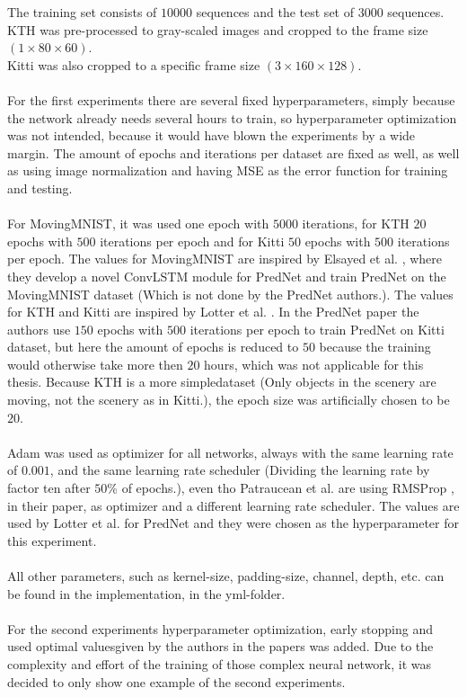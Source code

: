   The training set consists of $10000$ sequences and the test set of $3000$ sequences.\\
  KTH was pre-processed to gray-scaled images and cropped to the frame size $(1 \times 80 \times 60)$.\\
  Kitti was also cropped to a specific frame size $(3 \times 160 \times 128)$.
  \\\\
  For the first experiments there are several fixed hyperparameters, simply because the network already needs several hours to train, so hyperparameter 
  optimization was not intended, because it would have blown the experiments by a wide margin.
  The amount of epochs and iterations per dataset are fixed as well, as well as using image normalization and having MSE as the
  error function for training and testing.
  \\\\
  For MovingMNIST, it was used one epoch with $5000$ iterations, for KTH $20$ epochs with $500$ iterations per epoch and for Kitti $50$ epochs with $500$ 
  iterations per epoch. The values for MovingMNIST are inspired by Elsayed et al. \cite{Elsayed2018}, where they develop a novel ConvLSTM module for PredNet and 
  train PredNet on the MovingMNIST dataset (Which is not done by the PredNet authors.).
  The values for KTH and Kitti are inspired by Lotter et al. \cite{Lotter2016}.
  In the PredNet paper the authors use $150$ epochs with $500$ iterations per epoch to train PredNet on Kitti dataset, but here the amount of epochs is reduced to
  $50$ because the training would otherwise take more then $20$ hours, which was not applicable for this thesis. Because KTH is a more \glqq simple\grqq dataset 
  (Only 
  objects in the scenery are moving, not the scenery as in Kitti.), the epoch size was artificially chosen to be $20$.
  \\\\
  Adam \cite{Kingma2015} was used as optimizer for all networks, always with the same learning rate of $0.001$, and the same learning rate scheduler (Dividing the 
  learning rate by factor ten after $50$\% of epochs.), even tho 
  Patraucean et al. \cite{Patraucean2015} are using RMSProp \cite{Ruder2016}, in their paper, as optimizer and a different learning rate scheduler.
  The values are used by Lotter et al. \cite{Lotter2016} for PredNet and they were chosen as the hyperparameter for this experiment.
  \\\\
  All other parameters, such as kernel-size, padding-size, channel, depth, etc. can be found in the implementation, in the yml-folder.  
  \\\\
  For the second experiments hyperparameter optimization, early stopping and used \glqq optimal values\grqq given by the authors in the papers was added.
  Due to the complexity and effort of the training of those complex neural network, it was decided to only show one example of the second experiments.
  
